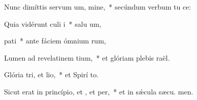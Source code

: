 \item Nunc dimíttis servum um, mine,~* secúndum verbum tu  ce:
\item Quia vidérunt culi i~* salu um,
\item {} pati~* ante fáciem ómnium rum,
\item Lumen ad revelatinem tium,~* et glóriam plebis  raël.
\item Glória tri, et lio,~* et Spirí to.
\item Sicut erat in princípio, et , et per,~* et in sǽcula sæcu. men.
